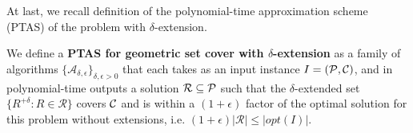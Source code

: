 At last, we recall definition of the
polynomial-time approximation scheme (PTAS) of
the problem with $\delta$-extension.

\begin{defi}
We define a \textbf{PTAS for geometric set cover 
with $\delta$-extension} as a family of algorithms
$\{\mathcal{A}_{\delta, \epsilon}\}_{\delta, \epsilon > 0}$ that
each takes as an input instance $I=(\mathcal{P}, \mathcal{C})$,
and in polynomial-time outputs a solution $\mathcal{R} \subseteq \mathcal{P}$
such that the $\delta$-extended set
$\{ R^{+\delta} :  R \in \mathcal{R} \}$ covers $\mathcal{C}$
and is within a $(1+\epsilon)$ factor of the optimal
solution for this problem without
extensions, i.e. $(1+\epsilon)|\mathcal{R}| \le |opt(I)|$.

\end{defi}
